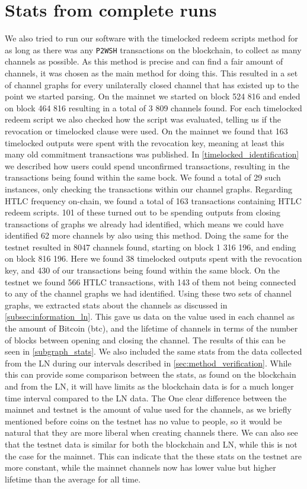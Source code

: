 \section{Stats from complete runs}
\label{sec:fullrun}

We also tried to run our software with the timelocked redeem scripts method for as long as there was any {\tt P2WSH} transactions on the blockchain, to collect as many channels as possible. As this method is precise and can find a fair amount of channels, it was chosen as the main method for doing this. This resulted in a set of channel graphs for every unilaterally closed channel that has existed up to the point we started parsing. On the mainnet we started on block 524 816 and ended on block 464 816 resulting in a total of 3 809 channels found. For each timelocked redeem script we also checked how the script was evaluated, telling us if the revocation or timelocked clause were used. On the mainnet we found that 163 timelocked outputs were spent with the revocation key, meaning at least this many old commitment transactions was published. In \cref{timelocked_identification} we described how users could spend unconfirmed transactions, resulting in the transactions being found within the same bock. We found a total of 29 such instances, only checking the transactions within our channel graphs.
Regarding HTLC frequency on-chain, we found a total of 163 transactions containing HTLC redeem scripts. 101 of these turned out to be spending outputs from closing transactions of graphs we already had identified, which means we could have identified 62 more channels by also using this method.
Doing the same for the testnet resulted in 8047 channels found, starting on block 1 316 196, and ending on block 816 196. Here we found 38 timelocked outputs spent with the revocation key, and 430 of our transactions being found within the same block. On the testnet we found 566 HTLC transactions, with 143 of them not being connected to any of the channel graphs we had identified. 
Using these two sets of channel graphs, we extracted stats about the channels as discussed in \cref{subsec:information_ln}. This gave us  data on the value used in each channel as the amount of Bitcoin (btc), and the lifetime of channels in terms of the number of blocks between opening and closing the channel. The results of this can be seen in \cref{subgraph_stats}.
We also included the same stats from the data collected from the LN during our intervals described in \cref{sec:method_verification}. 
While this can provide some comparison between the stats, as found on the blockchain and from the LN, it will have limits as the blockchain data is for a much longer time interval compared to the LN data.
The One clear difference between the mainnet and testnet is the amount of value used for the channels, as we briefly mentioned before coins on the testnet has no value to people, so it would be natural that they are more liberal when creating channels there. We can also see that the testnet data is similar for both the blockchain and LN, while this is not the case for the mainnet. This can indicate that the these stats on the testnet are more constant, while the mainnet channels now has lower value but higher lifetime than the average for all time.
\\

